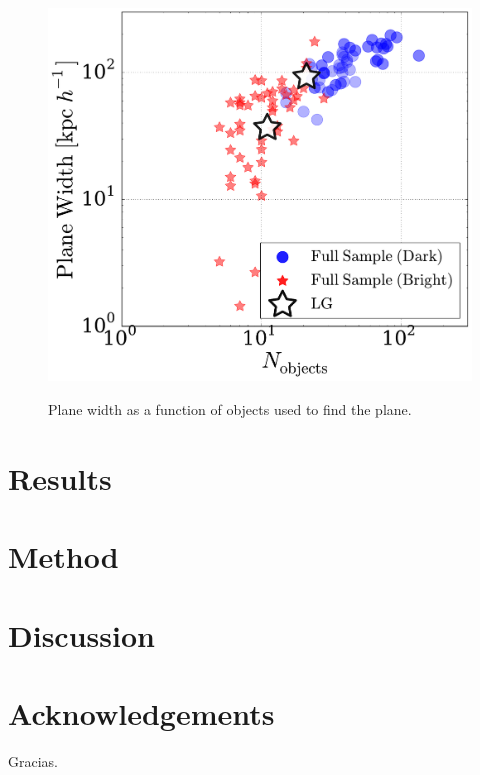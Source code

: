 \documentclass{emulateapj}
\begin{document}
\begin{figure}
\centering
\includegraphics[width=\hsize]{plane_width_n_dark.pdf}\\
\caption{Plane width as a function of objects used to find the plane.}
\label{fig:plane_width_nobjects}
\end{figure}

\section{Results}
\label{Results}

\section{Method}
\label{Method}




\section{Discussion} 
\section{Acknowledgements}
Gracias.
\end{document}
